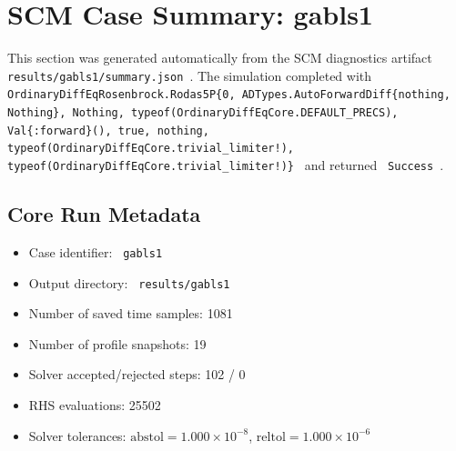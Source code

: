 \section{SCM Case Summary: gabls1}
\label{sec:scm_case_gabls1_gabls1_80x2m_9h_report}

This section was generated automatically from the SCM diagnostics artifact
\texttt{ results/gabls1/summary.json }. The simulation completed with \texttt{ OrdinaryDiffEqRosenbrock.Rodas5P\{0, ADTypes.AutoForwardDiff\{nothing, Nothing\}, Nothing, typeof(OrdinaryDiffEqCore.DEFAULT\_PRECS), Val\{:forward\}(), true, nothing, typeof(OrdinaryDiffEqCore.trivial\_limiter!), typeof(OrdinaryDiffEqCore.trivial\_limiter!)\} }
and returned \texttt{ Success }.

\subsection{Core Run Metadata}
\begin{itemize}
  \item Case identifier: \texttt{ gabls1 }
  \item Output directory: \texttt{ results/gabls1 }
  \item Number of saved time samples: 1081
  \item Number of profile snapshots: 19
  \item Solver accepted/rejected steps: 102 / 0
  \item RHS evaluations: 25502
  \item Solver tolerances: $\mathrm{abstol}=1.000 \times 10^{-8}$, $\mathrm{reltol}=1.000 \times 10^{-6}$
\end{itemize}

